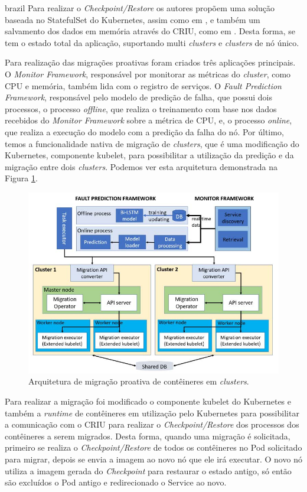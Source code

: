 \begin{otherlanguage*}{brazil}
Para realizar o \textit{Checkpoint/Restore} os autores propõem uma solução
baseada no StatefulSet do Kubernetes, assim como em \cite{vayghan2021kubernetes},
e também um salvamento dos dados em memória através do CRIU, como em
\cite{muller2022architecture}. Desta forma, se tem o estado total da aplicação,
suportando multi \textit{clusters} e \textit{clusters} de nó único.

Para realização das migrações proativas foram criados três aplicações
principais. O \textit{Monitor Framework}, responsável por monitorar as métricas
do \textit{cluster}, como CPU e memória, também lida com o registro de serviços.
O \textit{Fault Prediction Framework}, responsável pelo modelo de predição
de falha, que possui dois processos, o processo \textit{offline}, que realiza
o treinamento com base nos dados recebidos do \textit{Monitor Framework} sobre
a métrica de CPU, e, o processo \textit{online}, que realiza a execução do
modelo com a predição da falha do nó. Por último, temos a funcionalidade
nativa de migração de \textit{clusters}, que é uma modificação do Kubernetes,
componente kubelet, para possibilitar a utilização da predição e da migração
entre dois \textit{clusters}. Podemos ver esta arquitetura demonstrada na
Figura \ref{fig:proactive}.

\begin{figure}[h]
\centering
\includegraphics[scale=0.54]{images/proactive-architecture.png}
\caption{Arquitetura de migração proativa de contêineres em \textit{clusters}.}
\label{fig:proactive}
\end{figure}

Para realizar a migração foi modificado o componente kubelet do Kubernetes e
também a \textit{runtime} de contêineres em utilização pelo Kubernetes para
possibilitar a comunicação com o CRIU para realizar o \textit{Checkpoint/Restore}
dos processos dos contêineres a serem migrados. Desta forma, quando uma migração
é solicitada, primeiro se realiza o \textit{Checkpoint/Restore} de todos os
contêineres no Pod solicitado para migrar, depois se envia a imagem ao novo nó
que ele irá executar. O novo nó utiliza a imagem gerada do \textit{Checkpoint}
para restaurar o estado antigo, só então são excluídos o Pod antigo e
redirecionado o Service ao novo.


\end{otherlanguage*}
